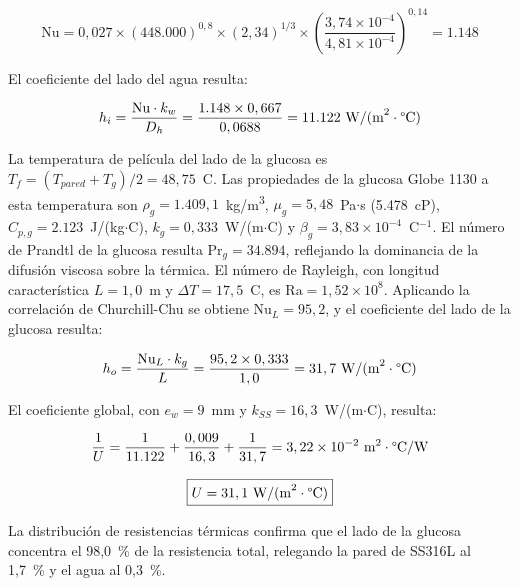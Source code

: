 \begin{equation}
\text{Nu} = 0,027 \times (448{.}000)^{0,8} \times (2,34)^{1/3} \times \left(\frac{3,74 \times 10^{-4}}{4,81 \times 10^{-4}}\right)^{0,14} = 1{.}148
\end{equation}

El coeficiente del lado del agua resulta:

\begin{equation}
h_i = \frac{\text{Nu} \cdot k_w}{D_h} = \frac{1{.}148 \times 0,667}{0,0688} = 11{.}122~\text{W/(m}^2 \cdot \text{\textdegree C)}
\end{equation}

La temperatura de pel\'icula del lado de la glucosa es $T_f = (T_{pared} + T_g)/2 = 48,75$~\textdegree C. Las propiedades de la glucosa Globe 1130 a esta temperatura son $\rho_g = 1{.}409,1$~kg/m\textsuperscript{3}, $\mu_g = 5,48$~Pa$\cdot$s (5{.}478~cP), $C_{p,g} = 2{.}123$~J/(kg$\cdot$\textdegree C), $k_g = 0,333$~W/(m$\cdot$\textdegree C) y $\beta_g = 3,83 \times 10^{-4}$~\textdegree C$^{-1}$. El n\'umero de Prandtl de la glucosa resulta $\text{Pr}_g = 34{.}894$, reflejando la dominancia de la difusi\'on viscosa sobre la t\'ermica. El n\'umero de Rayleigh, con longitud caracter\'istica $L = 1,0$~m y $\Delta T = 17,5$~\textdegree C, es $\text{Ra} = 1,52 \times 10^{8}$. Aplicando la correlaci\'on de Churchill-Chu se obtiene $\text{Nu}_L = 95,2$, y el coeficiente del lado de la glucosa resulta:

\begin{equation}
h_o = \frac{\text{Nu}_L \cdot k_g}{L} = \frac{95,2 \times 0,333}{1,0} = 31,7~\text{W/(m}^2 \cdot \text{\textdegree C)}
\end{equation}

El coeficiente global, con $e_w = 9$~mm y $k_{SS} = 16,3$~W/(m$\cdot$\textdegree C), resulta:

\begin{equation}
\frac{1}{U} = \frac{1}{11{.}122} + \frac{0,009}{16,3} + \frac{1}{31,7} = 3,22 \times 10^{-2}~\text{m}^2 \cdot \text{\textdegree C/W}
\end{equation}

\begin{equation}
\boxed{U = 31,1~\text{W/(m}^2 \cdot \text{\textdegree C)}}
\end{equation}

La distribuci\'on de resistencias t\'ermicas confirma que el lado de la glucosa concentra el 98,0~\% de la resistencia total, relegando la pared de SS316L al 1,7~\% y el agua al 0,3~\%.

